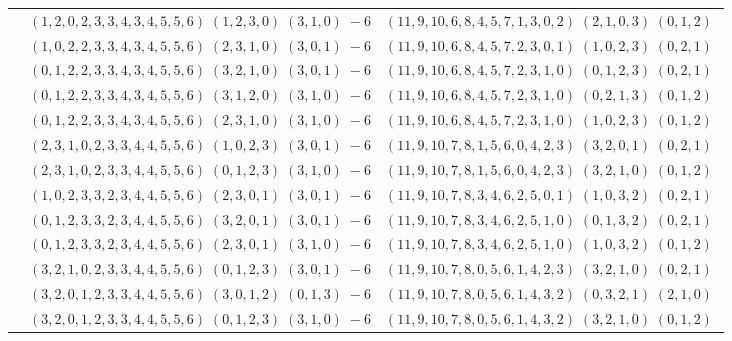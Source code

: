 \documentclass[11pt]{article}
\begin{document}
\begin{longtable}[l]{|c|c|c|}
 \cline{2-3} 
 & $(1 ,2 ,0 ,2 ,3 ,3 ,4 ,3 ,4 ,5 ,5 ,6) \;(1 ,2 ,3 ,0) \;(3 ,1 ,0) \;-6$ & $(11 ,9 ,10 ,6 ,8 ,4 ,5 ,7 ,1 ,3 ,0 ,2) \;(2 ,1 ,0 ,3) \;(0 ,1 ,2) \;$\\ 
 \cline{2-3} 
 & $(1 ,0 ,2 ,2 ,3 ,3 ,4 ,3 ,4 ,5 ,5 ,6) \;(2 ,3 ,1 ,0) \;(3 ,0 ,1) \;-6$ & $(11 ,9 ,10 ,6 ,8 ,4 ,5 ,7 ,2 ,3 ,0 ,1) \;(1 ,0 ,2 ,3) \;(0 ,2 ,1) \;$\\ 
 \cline{2-3} 
 & $(0 ,1 ,2 ,2 ,3 ,3 ,4 ,3 ,4 ,5 ,5 ,6) \;(3 ,2 ,1 ,0) \;(3 ,0 ,1) \;-6$ & $(11 ,9 ,10 ,6 ,8 ,4 ,5 ,7 ,2 ,3 ,1 ,0) \;(0 ,1 ,2 ,3) \;(0 ,2 ,1) \;$\\ 
 \cline{2-3} 
 & $(0 ,1 ,2 ,2 ,3 ,3 ,4 ,3 ,4 ,5 ,5 ,6) \;(3 ,1 ,2 ,0) \;(3 ,1 ,0) \;-6$ & $(11 ,9 ,10 ,6 ,8 ,4 ,5 ,7 ,2 ,3 ,1 ,0) \;(0 ,2 ,1 ,3) \;(0 ,1 ,2) \;$\\ 
 \cline{2-3} 
 & $(0 ,1 ,2 ,2 ,3 ,3 ,4 ,3 ,4 ,5 ,5 ,6) \;(2 ,3 ,1 ,0) \;(3 ,1 ,0) \;-6$ & $(11 ,9 ,10 ,6 ,8 ,4 ,5 ,7 ,2 ,3 ,1 ,0) \;(1 ,0 ,2 ,3) \;(0 ,1 ,2) \;$\\ 
 \cline{2-3} 
 & $(2 ,3 ,1 ,0 ,2 ,3 ,3 ,4 ,4 ,5 ,5 ,6) \;(1 ,0 ,2 ,3) \;(3 ,0 ,1) \;-6$ & $(11 ,9 ,10 ,7 ,8 ,1 ,5 ,6 ,0 ,4 ,2 ,3) \;(3 ,2 ,0 ,1) \;(0 ,2 ,1) \;$\\ 
 \cline{2-3} 
 & $(2 ,3 ,1 ,0 ,2 ,3 ,3 ,4 ,4 ,5 ,5 ,6) \;(0 ,1 ,2 ,3) \;(3 ,1 ,0) \;-6$ & $(11 ,9 ,10 ,7 ,8 ,1 ,5 ,6 ,0 ,4 ,2 ,3) \;(3 ,2 ,1 ,0) \;(0 ,1 ,2) \;$\\ 
 \cline{2-3} 
 & $(1 ,0 ,2 ,3 ,3 ,2 ,3 ,4 ,4 ,5 ,5 ,6) \;(2 ,3 ,0 ,1) \;(3 ,0 ,1) \;-6$ & $(11 ,9 ,10 ,7 ,8 ,3 ,4 ,6 ,2 ,5 ,0 ,1) \;(1 ,0 ,3 ,2) \;(0 ,2 ,1) \;$\\ 
 \cline{2-3} 
 & $(0 ,1 ,2 ,3 ,3 ,2 ,3 ,4 ,4 ,5 ,5 ,6) \;(3 ,2 ,0 ,1) \;(3 ,0 ,1) \;-6$ & $(11 ,9 ,10 ,7 ,8 ,3 ,4 ,6 ,2 ,5 ,1 ,0) \;(0 ,1 ,3 ,2) \;(0 ,2 ,1) \;$\\ 
 \cline{2-3} 
 & $(0 ,1 ,2 ,3 ,3 ,2 ,3 ,4 ,4 ,5 ,5 ,6) \;(2 ,3 ,0 ,1) \;(3 ,1 ,0) \;-6$ & $(11 ,9 ,10 ,7 ,8 ,3 ,4 ,6 ,2 ,5 ,1 ,0) \;(1 ,0 ,3 ,2) \;(0 ,1 ,2) \;$\\ 
 \cline{2-3} 
 & $(3 ,2 ,1 ,0 ,2 ,3 ,3 ,4 ,4 ,5 ,5 ,6) \;(0 ,1 ,2 ,3) \;(3 ,0 ,1) \;-6$ & $(11 ,9 ,10 ,7 ,8 ,0 ,5 ,6 ,1 ,4 ,2 ,3) \;(3 ,2 ,1 ,0) \;(0 ,2 ,1) \;$\\ 
 \cline{2-3} 
 & $(3 ,2 ,0 ,1 ,2 ,3 ,3 ,4 ,4 ,5 ,5 ,6) \;(3 ,0 ,1 ,2) \;(0 ,1 ,3) \;-6$ & $(11 ,9 ,10 ,7 ,8 ,0 ,5 ,6 ,1 ,4 ,3 ,2) \;(0 ,3 ,2 ,1) \;(2 ,1 ,0) \;$\\ 
 \cline{2-3} 
 & $(3 ,2 ,0 ,1 ,2 ,3 ,3 ,4 ,4 ,5 ,5 ,6) \;(0 ,1 ,2 ,3) \;(3 ,1 ,0) \;-6$ & $(11 ,9 ,10 ,7 ,8 ,0 ,5 ,6 ,1 ,4 ,3 ,2) \;(3 ,2 ,1 ,0) \;(0 ,1 ,2) \;$\\ 

\end{longtable}
\end{document}
